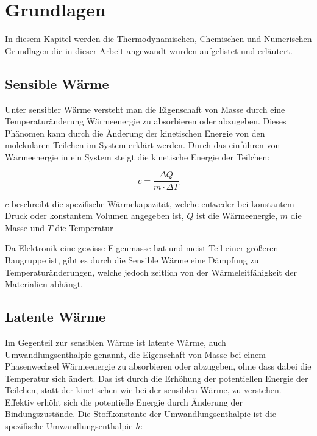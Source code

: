 \chapter{Grundlagen}
\label{chap:Grundlagen}			%

In diesem Kapitel werden die Thermodynamischen, Chemischen und Numerischen Grundlagen die in dieser Arbeit angewandt wurden aufgelistet
und erläutert.

\section{Sensible Wärme}\label{sec:sensiblewaerme}

Unter sensibler Wärme versteht man die Eigenschaft von Masse durch eine Temperaturänderung Wärmeenergie zu absorbieren oder abzugeben. Dieses
Phänomen kann durch die Änderung der kinetischen Energie von den molekularen Teilchen im System erklärt werden. Durch das einführen von
Wärmeenergie in ein System steigt die kinetische Energie der Teilchen:

\begin{equation}
    c = \frac{\Delta Q}{m \cdot \Delta T}
\end{equation}

$c$ beschreibt die spezifische Wärmekapazität, welche entweder bei konstantem Druck oder konstantem Volumen angegeben ist,
$Q$ ist die Wärmeenergie, $m$ die Masse und $T$ die Temperatur

Da Elektronik eine gewisse Eigenmasse hat und meist Teil einer größeren Baugruppe ist, gibt es durch die Sensible Wärme eine Dämpfung
zu Temperaturänderungen, welche jedoch zeitlich von der Wärmeleitfähigkeit der Materialien abhängt.

\section{Latente Wärme}\label{sec:latentewaerme}

Im Gegenteil zur sensiblen Wärme ist latente Wärme, auch Umwandlungsenthalpie genannt, die Eigenschaft von Masse bei einem Phasenwechsel Wärmeenergie
zu absorbieren oder abzugeben, ohne dass dabei die Temperatur sich ändert. Das ist durch die Erhöhung der potentiellen Energie der Teilchen,
statt der kinetischen wie bei der sensiblen Wärme, zu verstehen. Effektiv erhöht sich die potentielle Energie durch Änderung der Bindungszustände.
Die Stoffkonstante der Umwandlungsenthalpie ist die spezifische Umwandlungsenthalpie $h$:

